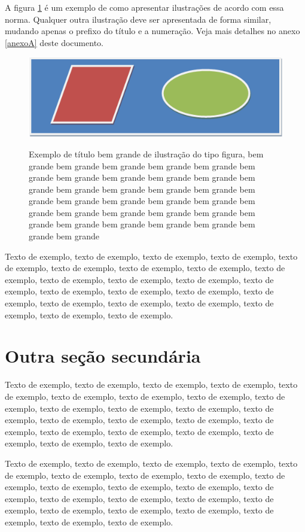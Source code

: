 \documentclass[
	12pt,				%
	oneside,			%
	a4paper,			%
	english,			%
	brazil				%
	]{abntex2ppgsi}
\begin{document}
A figura \ref{fig:figura-exemplo4} é um exemplo de como apresentar ilustrações de acordo com essa norma. Qualquer outra ilustração deve ser apresentada de forma similar, mudando apenas o prefixo do título e a numeração. Veja mais detalhes no anexo \ref{anexoA} deste documento.

\begin{figure}[htbp]
	\centering
	\caption{Exemplo de título bem grande de ilustração do tipo figura, bem grande bem grande bem grande bem grande bem grande bem grande bem grande bem grande bem grande bem grande bem grande bem grande bem grande bem grande bem grande bem grande bem grande bem grande bem grande bem grande bem grande bem grande bem grande bem grande bem grande bem grande bem grande bem grande bem grande bem grande bem grande bem grande}
		\includegraphics{figura-exemplo.png}
	\label{fig:figura-exemplo4}
\end{figure}

Texto de exemplo, texto de exemplo, texto de exemplo, texto de exemplo, texto de exemplo, texto de exemplo, texto de exemplo, texto de exemplo, texto de exemplo, texto de exemplo, texto de exemplo, texto de exemplo, texto de exemplo, texto de exemplo, texto de exemplo, texto de exemplo, texto de exemplo, texto de exemplo, texto de exemplo, texto de exemplo, texto de exemplo, texto de exemplo, texto de exemplo.

\section{Outra seção secundária}

Texto de exemplo, texto de exemplo, texto de exemplo, texto de exemplo, texto de exemplo, texto de exemplo, texto de exemplo, texto de exemplo, texto de exemplo, texto de exemplo, texto de exemplo, texto de exemplo, texto de exemplo, texto de exemplo, texto de exemplo, texto de exemplo, texto de exemplo, texto de exemplo, texto de exemplo, texto de exemplo, texto de exemplo, texto de exemplo, texto de exemplo.

Texto de exemplo, texto de exemplo, texto de exemplo, texto de exemplo, texto de exemplo, texto de exemplo, texto de exemplo, texto de exemplo, texto de exemplo, texto de exemplo, texto de exemplo, texto de exemplo, texto de exemplo, texto de exemplo, texto de exemplo, texto de exemplo, texto de exemplo, texto de exemplo, texto de exemplo, texto de exemplo, texto de exemplo, texto de exemplo, texto de exemplo.
\end{document}
